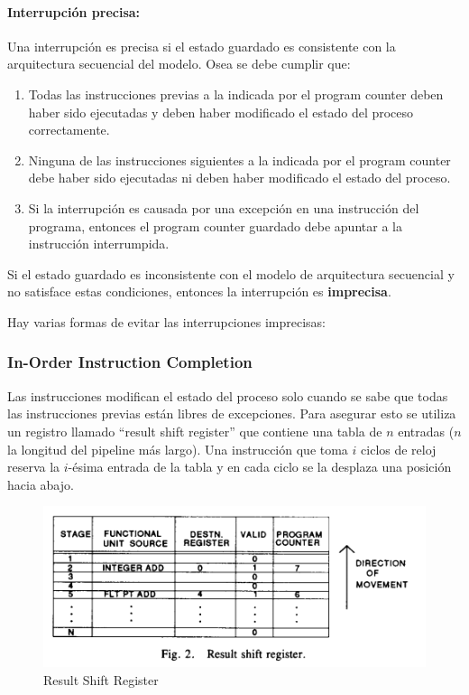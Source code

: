 \paragraph{Interrupción precisa:} Una interrupción es precisa si el estado guardado es consistente con la arquitectura secuencial del modelo. Osea se debe cumplir que:
\begin{enumerate}
	\item Todas las instrucciones previas a la indicada por el program counter deben haber sido ejecutadas y deben haber modificado el estado del proceso correctamente.
	\item Ninguna de las instrucciones siguientes a la indicada por el program counter debe haber sido ejecutadas ni deben haber modificado el estado del proceso.
	\item Si la interrupción es causada por una excepción en una instrucción del programa, entonces el program counter guardado debe apuntar a la instrucción interrumpida.
\end{enumerate}

Si el estado guardado es inconsistente con el modelo de arquitectura secuencial y no satisface estas condiciones, entonces la interrupción es \textbf{imprecisa}. 

Hay varias formas de evitar las interrupciones imprecisas:

\subsubsection{In-Order Instruction Completion}
Las instrucciones modifican el estado del proceso solo cuando se sabe que todas las instrucciones previas están libres de excepciones. Para asegurar esto se utiliza un registro llamado ``result shift register'' que contiene una tabla de $n$  entradas ($n$ la longitud del pipeline más largo). Una instrucción que toma $i$ ciclos de reloj reserva la $i$-ésima entrada de la tabla y en cada ciclo se la desplaza una posición hacia abajo.
\begin{figure}[ht]
	\centering
	\includegraphics[width=0.5\linewidth]{imagenes/shift-register}
	\caption{Result Shift Register}
	\label{fig:shiftregister}
\end{figure}

